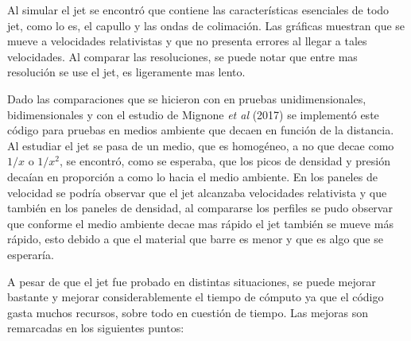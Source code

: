 \documentclass[12pt,a4paper]{book}
\begin{document}
Al simular el jet se encontró que contiene las características esenciales de todo jet, como lo es, el capullo y las ondas de colimación. Las gráficas muestran que se mueve a velocidades relativistas y que no presenta 
errores al llegar a tales velocidades. Al comparar las resoluciones, se puede notar que entre mas resolución se use el jet, es ligeramente mas lento.

Dado las comparaciones que se hicieron con en pruebas unidimensionales, bidimensionales y con el estudio de Mignone \emph{et al} (2017) se implementó este código para pruebas en medios ambiente que decaen en función de la 
distancia. Al estudiar el jet se pasa de  un medio, que es homogéneo, a no que decae como $1/x$ o $1/x^2$, se encontró, como se esperaba, que los picos de densidad y presión decaían en proporción a como lo hacia el 
medio ambiente. En los paneles de velocidad se podría observar que el jet alcanzaba velocidades relativista y que también en los paneles de densidad, al compararse los perfiles se pudo observar que conforme el medio 
ambiente decae mas rápido el jet también se mueve más rápido, esto debido a que el material que barre es menor  y que es algo que se esperaría.

A pesar de que el jet fue probado en distintas situaciones, se puede mejorar bastante y mejorar considerablemente el tiempo de cómputo ya que el código gasta muchos recursos, sobre todo en cuestión de tiempo. 
Las mejoras son remarcadas en los siguientes puntos:
\end{document}
